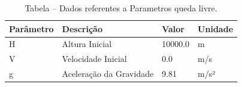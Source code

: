 \begin{table}[H]
\centering
\caption{Tabela – Dados referentes a Parametros queda livre.}
\label{tab:parametros_queda_livre}
\begin{tabular}{llll}
\toprule
Parâmetro & Descrição & Valor & Unidade \\
\midrule
H & Altura Inicial & 10000.0 & m \\
V & Velocidade Inicial & 0.0 & m/s \\
g & Aceleração da Gravidade & 9.81 & m/s² \\
\bottomrule
\end{tabular}

\end{table}

